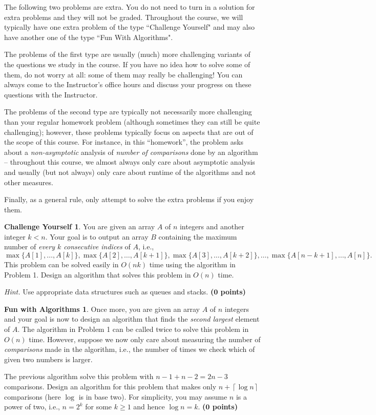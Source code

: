 \documentclass{article}
\theoremstyle{definition}
\newtheorem*{fun}{Fun with Algorithms}
\newtheorem*{challenge}{Challenge Yourself}
\newcommand{\grade}[1]{\hfill{\textbf{($\mathbf{#1}$ points)}}}
\newcommand{\ceil}[1]{{\left\lceil{#1}\right\rceil}}
\begin{document}
The following two problems are extra. You do not need to turn in a solution for extra problems and they will not be graded. Throughout the course, we will typically have one extra problem of the type ``Challenge Yourself" and may also
have another one of the type ``Fun With Algorithms". 

The problems of the first type are usually (much) more challenging variants of the questions we study in the course. If you have no idea how to solve some of them, do not worry at all: some 
of them may really be challenging! You can always come to the Instructor's office hours and discuss your progress on these questions with the Instructor. 

The problems of the second type are typically not necessarily more challenging than your regular homework problem (although sometimes they can still be quite challenging); however, these problems typically focus on aspects
that are out of the scope of this course. For instance, in this ``homework'', the problem asks about a \emph{non-asymptotic} analysis of \emph{number of comparisons} done by an algorithm -- 
throughout this course, we almost always only care about asymptotic analysis and usually (but not always) only care about runtime of the algorithms and not other measures. 

Finally, as a general rule, only attempt to solve the extra problems if you enjoy them. 

\begin{challenge} 
	You are given an array $A$ of $n$ integers and another integer $k < n$. Your goal is to output an array $B$ containing the maximum number of \emph{every $k$ consecutive indices} of $A$, i.e., 
	\[
		\max\{A[1],\ldots,A[k]\}, \max\{A[2],\ldots,A[k+1]\}, \max\{A[3],\ldots,A[k+2]\},\ldots,\max\{A[n-k+1],\ldots,A[n]\}.
	\]
	This problem can be solved easily in $O(nk)$ time using the algorithm in Problem 1. Design an algorithm that solves this problem in $O(n)$ time. 
	
	\emph{Hint.} Use appropriate data structures such as queues and stacks. \grade{0}
\end{challenge}

\begin{fun}
Once more, you are given an array $A$ of $n$ integers and your goal is now to design an algorithm that finds the \emph{second largest} element of $A$. The algorithm in Problem 1 can be called twice to solve this problem
in $O(n)$ time. However, suppose we now only care about measuring the number of \emph{comparisons} made in the algorithm, i.e., the number of times we check which of given two numbers is larger. 

The previous algorithm solve this problem with $n-1+n-2 = 2n-3$ comparisons. Design an algorithm for this problem that makes only $n+\ceil{\log{n}}$ comparisons (here $\log$ is in base two). 
For simplicity, you may assume $n$ is a power of two, i.e., $n=2^{k}$ for some
$k \geq 1$ and hence $\log{n} = k$.    \grade{0}
\end{fun}
\end{document}
